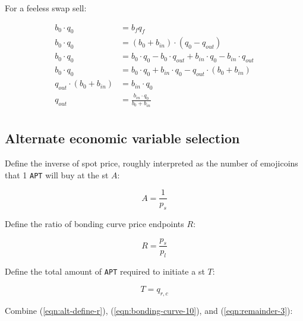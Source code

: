 \documentclass[table, twocolumn]{article}
\begin{document}
For a feeless swap sell:

\begin{align}
  b_0 \cdot q_0               & = b_f q_f \nonumber                               \\
  b_0 \cdot q_0               & = (b_0 + b_{in}) \cdot (q_0 - q_{out}) \nonumber  \\
  b_0 \cdot q_0               & = b_0 \cdot q_0 - b_0 \cdot q_{out} +
  b_{in} \cdot q_0 - b_{in} \cdot q_{out} \nonumber                               \\
  b_0 \cdot q_0               & = b_0 \cdot q_0 + b_{in} \cdot q_0 -
  q_{out} \cdot(b_0 + b_{in}) \nonumber                                           \\
  q_{out} \cdot(b_0 + b_{in}) & = b_{in} \cdot q_0 \nonumber                      \\
  q_{out}                     & = \frac{b_{in} \cdot q_0}{b_0 + b_{in}} \nonumber \\
\end{align}

\subsection{Alternate economic variable selection} \label{sec:alt-vars}

Define the inverse of spot price, roughly interpreted as the number of emojicoins that 1
\texttt{APT} will buy at the \gls*{st} $A$:

\begin{equation} \label{eqn:alt-define-a}
  A = \frac{1}{p_s}
\end{equation}

Define the ratio of bonding curve price endpoints $R$:

\begin{equation} \label{eqn:alt-define-r}
  R = \frac{p_s}{p_l}
\end{equation}

Define the total amount of \texttt{APT} required to initiate a \gls*{st} $T$:

\begin{equation} \label{eqn:alt-define-t}
  T = q_{r, c}
\end{equation}

Combine (\ref{eqn:alt-define-r}), (\ref{eqn:bonding-curve-10}), and
(\ref{eqn:remainder-3}):
\end{document}
